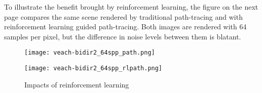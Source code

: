 To illustrate the benefit brought by reinforcement learning, the figure on the next page compares the same scene rendered by traditional path-tracing and with reinforcement learning guided path-tracing. Both images are rendered with 64 samples per pixel, but the difference in noise levels between them is blatant. 

\begin{figure}[H]
    \centering
    
    \begin{minipage}[t]{.99\textwidth}
        \centering
        \vspace{0pt}
        \texttt{[image: veach-bidir2\_64spp\_path.png]}
    \end{minipage}
    
    \vspace{0.3cm}

    \begin{minipage}[t]{.99\textwidth}
        \centering
        \vspace{0pt}
        \texttt{[image: veach-bidir2\_64spp\_rlpath.png]}
    \end{minipage}
    
    \caption{Impacts of reinforcement learning}
    \label{fig RL comparison}
\end{figure}
